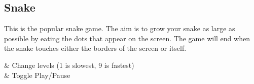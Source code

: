 \subsection{Snake}

This is the popular snake game. The aim is to grow your snake as large
as possible by eating the dots that appear on the screen. The game will
end when the snake touches either the borders of the screen or itself.

\begin{table}
    \begin{btnmap}{}{}
     & Change levels (1 is slowest, 9 is fastest)\\
    & Toggle Play/Pause\\
    \end{btnmap}
\end{table}
